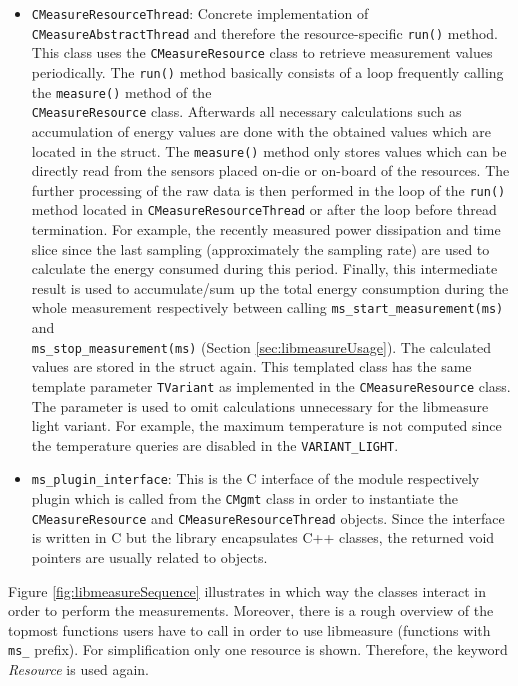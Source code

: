 \begin{description}
\begin{itemize}
		\item \texttt{CMeasureResourceThread}: Concrete implementation of\\ 
		\texttt{CMeasureAbstractThread} and therefore the resource-specific \texttt{run()} method. This class uses the \texttt{CMeasureResource} class to retrieve measurement values periodically. The \texttt{run()} method basically consists of a loop frequently calling the \texttt{measure()} method of the\\ \texttt{CMeasureResource} class. Afterwards all necessary calculations such as accumulation of energy values are done with the obtained values which are located in the  struct. The \texttt{measure()} method only stores values which can be directly read from the sensors placed on-die or on-board of the resources. The further processing of the raw data is then performed in the loop of the \texttt{run()} method located in \texttt{CMeasureResourceThread} or after the loop before thread termination. For example, the recently measured power dissipation and time slice since the last sampling (approximately the sampling rate) are used to calculate the energy consumed during this period. Finally, this intermediate result is used to accumulate/sum up the total energy consumption during the whole measurement respectively between calling \texttt{ms\_start\_measurement(ms)} and \\\texttt{ms\_stop\_measurement(ms)} (Section \ref{sec:libmeasureUsage}). The calculated values are stored in the struct again. This templated class has the same template parameter \texttt{TVariant} as implemented in the \texttt{CMeasureResource} class. The parameter is used to omit calculations unnecessary for the libmeasure light variant. For example, the maximum temperature is not computed since the temperature queries are disabled in the \texttt{VARIANT\_LIGHT}.
		
		\item \texttt{ms\_plugin\_interface}: This is the C interface of the module respectively plugin which is called from the \texttt{CMgmt} class in order to instantiate the \texttt{CMeasureResource} and \texttt{CMeasureResourceThread} objects. Since the interface is written in C but the library encapsulates C++ classes, the returned void pointers are usually related to objects.
	\end{itemize}
\end{description}

Figure \ref{fig:libmeasureSequence} illustrates in which way the classes interact in order to perform the measurements. Moreover, there is a rough overview of the topmost functions users have to call in order to use libmeasure (functions with \texttt{ms\_} prefix). For simplification only one resource is shown. Therefore, the keyword \textit{Resource} is used again.\\

